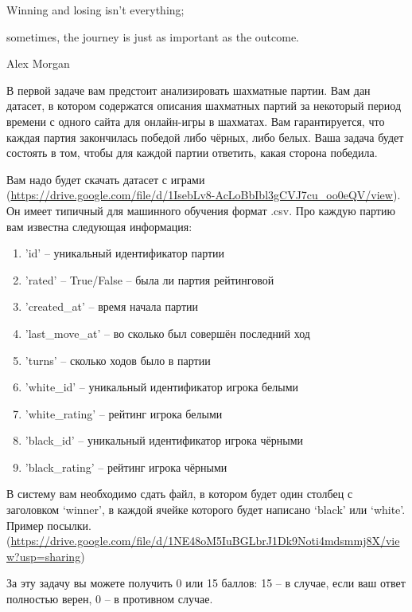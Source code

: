 
Winning and losing isn't everything;

sometimes, the journey is just as important as the outcome.

Alex Morgan

В первой задаче вам предстоит анализировать шахматные партии. Вам дан датасет, в котором содержатся описания шахматных партий за некоторый период времени с одного сайта для онлайн-игры в шахматах. Вам гарантируется, что каждая партия закончилась победой либо чёрных, либо белых. Ваша задача будет состоять в том, чтобы для каждой партии ответить, какая сторона победила.


Вам надо будет скачать датасет с играми (\url{https://drive.google.com/file/d/1IsebLv8-AcLoBbIbl3gCVJ7cu_oo0eQV/view}). Он имеет типичный для машинного обучения формат .csv. Про каждую партию вам известна следующая информация:

\begin{enumerate}
    \item 'id' -- уникальный идентификатор партии
    \item 'rated' -- True/False -- была ли партия рейтинговой
    \item 'created\_at' -- время начала партии
    \item 'last\_move\_at' -- во сколько был совершён последний ход
    \item 'turns' -- сколько ходов было в партии
    \item 'white\_id' -- уникальный идентификатор игрока белыми
    \item 'white\_rating' -- рейтинг игрока белыми
    \item 'black\_id' -- уникальный идентификатор игрока чёрными
    \item 'black\_rating' -- рейтинг игрока чёрными
\end{enumerate}

\outputfmtSection

В систему вам необходимо сдать файл, в котором будет один столбец с заголовком ‘winner’, в каждой ячейке которого будет написано ‘black’ или ‘white’. Пример посылки. (\url{https://drive.google.com/file/d/1NE48oM5IuBGLbrJ1Dk9Noti4mdsmmj8X/view?usp=sharing})

\markSection

За эту задачу вы можете получить 0 или 15 баллов: 15 -- в случае, если ваш ответ полностью верен, 0 -- в противном случае.

